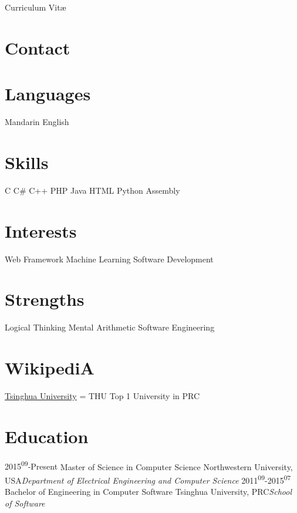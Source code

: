 \documentclass[]{luofei}
\begin{document}
       {Curriculum Vit\ae}
\begin{aside}
  \section{Contact}
\href{callto:2249993417}{}
\href{mailto:feiluo2015@u.northwestern.edu}{}
\href{www.luofei.cc}{}
\section{Languages}
\textbullet{} Mandarin
\textbullet{} English
\section{Skills}
\textbullet{} C 
\textbullet{} C\#
\textbullet{} C++ 
\textbullet{} PHP
\textbullet{} Java
\textbullet{} HTML 
\textbullet{} {\color{red} \faHeart}Python
\textbullet{} Assembly
\section{Interests}
\textbullet{} Web Framework
\textbullet{} Machine Learning
\textbullet{} Software Development
\section{Strengths}
\textbullet{} Logical Thinking
\textbullet{} Mental Arithmetic
\textbullet{} Software Engineering
\section{WikipediA}
\textbullet{} \href{https://en.wikipedia.org/wiki/Tsinghua_University}{Tsinghua University} = THU
Top 1 University in PRC
\end{aside}

\section{Education}
\begin{entrylist}
 \entry
    {2015\textsuperscript{09}-Present}
    {Master of Science in Computer Science}
    {Northwestern University, USA}{\emph{Department of Electrical Engineering and Computer Science}}
  \entry
    {2011\textsuperscript{09}-2015\textsuperscript{07}}
    {Bachelor of Engineering in Computer Software}
    {Tsinghua University, PRC}{\emph{School of Software}}
\end{entrylist}
\end{document}
